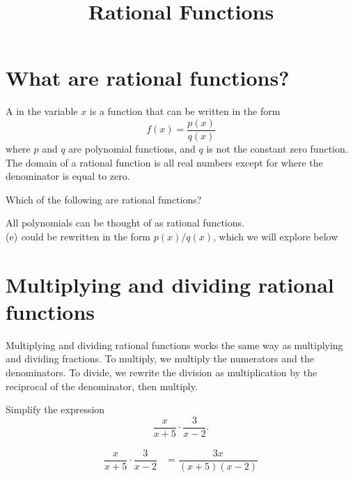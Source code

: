 \documentclass{ximera}
\title{Rational Functions}
\begin{document}
\begin{abstract} \end{abstract}
\maketitle



\section{What are rational functions?}
\begin{definition}
  A  in the variable $x$ is a function that can be written in the form
  \[
  f(x) = \frac{p(x)}{q(x)}
  \]
  where $p$ and $q$ are polynomial functions, and $q$ is not the constant zero function. The domain of a rational
  function is all real numbers except for where the denominator is
  equal to zero.
\end{definition}


\begin{question}
  Which of the following are rational functions?
  \begin{selectAll}
  \end{selectAll}
  \begin{feedback}
    All polynomials can be thought of as rational functions.
    \\(e) \emph could be rewritten in the form $p(x)/q(x)$, which we will explore below
  \end{feedback}
\end{question}

\section{Multiplying and dividing rational functions}

Multiplying and dividing rational functions works the same way as multiplying and dividing fractions. To multiply, we multiply the numerators and the denominators. To divide, we rewrite the division as multiplication by the reciprocal of the denominator, then multiply.

\begin{example}
	Simplify the expression \[ \dfrac{x}{x+5}\cdot\dfrac{3}{x-2}. \]
	\begin{explanation}
		\begin{align*}
			\dfrac{x}{x+5}\cdot\dfrac{3}{x-2} &= \dfrac{3x}{(x+5)(x-2)}\\
		\end{align*}
	\end{explanation}
\end{example}
\end{document}
